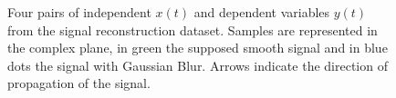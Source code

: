 \begin{figure}[htbp]
	\centering
	\caption{Four pairs of independent $ x(t) $ and dependent variables $ y(t) $ from the signal reconstruction dataset. Samples are represented in the complex plane, in green the supposed smooth signal and in blue dots the signal with Gaussian Blur. Arrows indicate the direction of propagation of the signal.}
	\label{fig:sig_dataset}
\end{figure}

